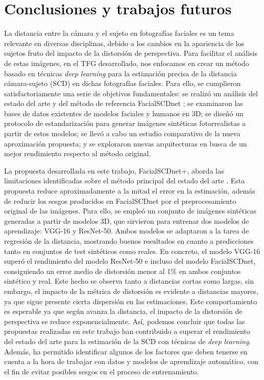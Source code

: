 \chapter{Conclusiones y trabajos futuros}

\thispagestyle{empty}

La distancia entre la cámara y el sujeto en fotografías faciales es un tema relevante en diversas disciplinas, debido a los cambios en la apariencia de los sujetos fruto del impacto de la distorsión de perspectiva. Para facilitar el análisis de estas imágenes, en el TFG desarrollado, nos enfocamos en crear un método basado en técnicas \textit{deep learning} para la estimación precisa de la distancia cámara-sujeto (SCD) en dichas fotografías faciales. Para ello, se cumplieron satisfactoriamente una serie de objetivos fundamentales: se realizó un análisis del estado del arte y del método de referencia FacialSCDnet \cite{14}; se examinaron las bases de datos existentes de modelos faciales y humanos en 3D; se diseñó un protocolo de estandarización para generar imágenes sintéticas fotorrealistas a partir de estos modelos; se llevó a cabo un estudio comparativo de la nueva aproximación propuesta; y se exploraron nuevas arquitecturas en busca de un mejor rendimiento respecto al método original.


La propuesta desarrollada en este trabajo, FacialSCDnet+, aborda las limitaciones identificadas sobre el método principal del estado del arte \cite{14}. Esta propuesta reduce aproximadamente a la mitad el error en la estimación, además de reducir los sesgos producidos en FacialSCDnet por el preprocesamiento original de las imágenes. Para ello, se empleó un conjunto de imágenes sintéticas generadas a partir de modelos 3D, que sirvieron para entrenar dos modelos de aprendizaje: VGG-16 y ResNet-50. Ambos modelos se adaptaron a la tarea de regresión de la distancia, mostrando buenos resultados en cuanto a predicciones tanto en conjuntos de test sintéticos como reales. En concreto, el modelo VGG-16 superó el rendimiento del modelo ResNet-50 e incluso del modelo FacialSCDnet, consiguiendo un error medio de distorsión menor al 1\% en ambos conjuntos sintético y real. Este hecho se observa tanto a distancias cortas como largas, sin embargo, el impacto de la métrica de distorsión es evidente a distancias mayores, ya que sigue presente cierta dispersión en las estimaciones. Este comportamiento es esperable ya que según avanza la distancia, el impacto de la distorsión de perspectiva se reduce exponencialmente. Así, podemos concluir que todas las propuestas realizadas en este trabajo han contribuido a superar el rendimiento del estado del arte para la estimación de la SCD con técnicas de \textit{deep learning}. Además, ha permitido identificar algunos de los factores que deben tenerse en cuenta a la hora de trabajar con datos y modelos de aprendizaje automático, con el fin de evitar posibles sesgos en el proceso de entrenamiento.

